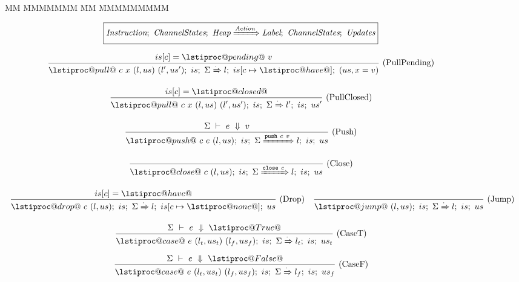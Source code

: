
\begin{figure}
\begin{tabbing}
MM \= MMMMMMM \= MM \= MMMMMMMMM\kill
\end{tabbing}


$$
  \boxed{
    \textit{Instruction};~\textit{ChannelStates};~\textit{Heap} \xRightarrow{\textit{Action}} \textit{Label};~\textit{ChannelStates};~\textit{Updates}
  }
$$

$$
\ruleIN{
  is[c] = \lstiproc@pending@~v
}{
  \ProcBlockShake
        {\lstiproc@pull@~c~x~(l,us)~(l',us')}
        {is}
        {\Sigma}
        {\cdot}
        {l}
        {is[c \mapsto \lstiproc@have@]}
        {(us, x = v)}
}{PullPending}
$$

$$
\ruleIN{
  is[c] = \lstiproc@closed@
}{
  \ProcBlockShake
        {\lstiproc@pull@~c~x~(l,us)~(l',us')}
        {is}
        {\Sigma}
        {\cdot}
        {l'}
        {is}
        {us'}
}{PullClosed}
$$

$$
\ruleIN{
  \ExpEval{\Sigma}{e}{v}
}{
  \ProcBlockShake
        {\lstiproc@push@~c~e~(l,us)}
        {is}
        {\Sigma}
        {\Push~c~v}
        {l}
        {is}
        {us}
}{Push}
$$

$$
\ruleAx{
  \ProcBlockShake
        {\lstiproc@close@~c~(l,us)}
        {is}
        {\Sigma}
        {\Close~c}
        {l}
        {is}
        {us}
}{Close}
$$


$$
\ruleIN{
  is[c] = \lstiproc@have@
}{
  \ProcBlockShake
        {\lstiproc@drop@~c~(l,us)}
        {is}
        {\Sigma}
        {\cdot}
        {l}
        {is[c \mapsto \lstiproc@none@]}
        {us}
}{Drop}
\ruleIN{
}{
  \ProcBlockShake
        {\lstiproc@jump@~(l,us)}
        {is}
        {\Sigma}
        {\cdot}
        {l}
        {is}
        {us}
}{Jump}
$$

$$
\ruleIN{
  \ExpEval{\Sigma}{e}{\lstiproc@True@}
}{
  \ProcBlockShake
        {\lstiproc@case@~e~(l_t,us_t)~(l_f,us_f)}
        {is}
        {\Sigma}
        {\cdot}
        {l_t}
        {is}
        {us_t}
}{CaseT}
$$
$$
\ruleIN{
  \ExpEval{\Sigma}{e}{\lstiproc@False@}
}{
  \ProcBlockShake
        {\lstiproc@case@~e~(l_t,us_t)~(l_f,us_f)}
        {is}
        {\Sigma}
        {\cdot}
        {l_f}
        {is}
        {us_f}
}{CaseF}
$$

\vspace{2em}


\end{figure}
